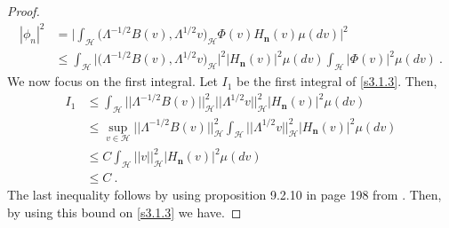 \documentclass[]{interact}
\theoremstyle{plain}%
\theoremstyle{definition}
\theoremstyle{remark}
\begin{document}
\begin{proof}
\begin{equation}
            \label{s3.1.3}
            \begin{aligned}
                |\phi_n |^2 &=
                    \Bigg|
                        \int_{\mathcal{H}}
                            \big(
                                \Lambda^{-1/2}B(v),\Lambda^{1/2}v
                            \big)_{\mathcal{H}} \Phi(v)
                            H_{\mathbf{n}}(v) \mu(dv)
                    \Bigg|^2
                    \\
                    &\le
                    \int_{\mathcal{H}}
                    \big|
                        \big(
                            \Lambda^{-1/2}B(v),\Lambda^{1/2} v
                        \big)_{\mathcal{H}}
                    \big|^2
                    \big|
                        H_{\mathbf{n}}(v)
                    \big|^2 \mu(dv)
                    \int_{\mathcal{H}}
                    \big|
                        \Phi(v)
                    \big|^2  \mu(dv)
                    \ .
             \end{aligned}
        \end{equation}
        We now focus on the first integral. Let $I_1$ be the first integral of
        \eqref{s3.1.3}. Then,
        \begin{align*}
            I_1
                &
                    \le \int_{\mathcal{H}} \big| \big| \Lambda^{-1/2} B(v)
                    \big| \big|_{\mathcal{H}}^2
                    \big| \big| 
                        \Lambda^{1/2}v 
                    \big|\big|_{\mathcal{H}}^2
                    \big|H_{\mathbf{n}}(v)\big|^2 \mu(dv)
                    \\
                &
                    \le \sup_{v\in\mathcal{H}} 
                    \big|\big|\Lambda^{-1/2}B(v)
                    \big|\big|_{\mathcal{H}}^2
                    \int_{\mathcal{H}} 
                    \big|\big|
                        \Lambda^{1/2}v 
                    \big|\big|_{\mathcal{H}}^2
                    \big|H_{\mathbf{n}}(v)\big|^2 \mu(dv)
                    \\
                & 
                    \le C \int_{\mathcal{H}} 
                    \big|\big| v \big|\big|_{\mathcal{H}}^2
                    \big|H_{\mathbf{n}}(v)\big|^2 \mu(dv)
                \\
                & 
                    \le C \ .
        \end{align*}
%
        The last inequality follows by using proposition 9.2.10 in page 198 from
        \cite{da-za1}. Then, by using this bound on \eqref{s3.1.3} we have.

\end{proof}
\end{document}
